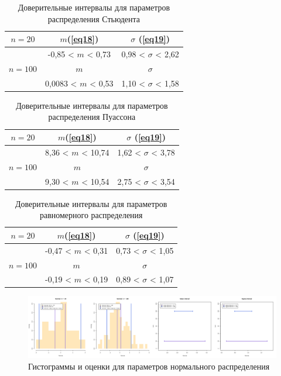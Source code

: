 \begin{table}[H]
\centering
\begin{tabular}{ |c|c|c| } 
 \hline
 $n = 20$ & $m$(\ref{eq18}) & $\sigma$ (\ref{eq19})\\ 
 \hline
  & -0,85 < $m$ < 0,73 & 0,98 < $\sigma$ < 2,62\\ 
  \hline
  $n = 100$ & $m$ & $\sigma$ \\
  \hline
  & 0,0083 < $m$ < 0,53 & 1,10 < $\sigma$ < 1,58 \\ 
 \hline
\end{tabular}
\caption{Доверительные интервалы для параметров распределения Стьюдента}
    \label{table:8}
\end{table}

\begin{table}[H]
\centering
\begin{tabular}{ |c|c|c| } 
 \hline
 $n = 20$ & $m$(\ref{eq18}) & $\sigma$ (\ref{eq19})\\ 
 \hline
  & 8,36 < $m$ < 10,74 & 1,62 < $\sigma$ < 3,78\\ 
  \hline
  $n = 100$ & $m$ & $\sigma$ \\
  \hline
  & 9,30 < $m$ < 10,54 & 2,75 < $\sigma$ < 3,54 \\ 
 \hline
\end{tabular}
\caption{Доверительные интервалы для параметров распределения Пуассона}
    \label{table:9}
\end{table}

\begin{table}[H]
\centering
\begin{tabular}{ |c|c|c| } 
 \hline
 $n = 20$ & $m$(\ref{eq18}) & $\sigma$ (\ref{eq19})\\ 
 \hline
  & -0,47 < $m$ < 0,31 & 0,73 < $\sigma$ < 1,05\\ 
  \hline
  $n = 100$ & $m$ & $\sigma$ \\
  \hline
  & -0,19 < $m$ < 0,19 & 0,89 < $\sigma$ < 1,07 \\ 
 \hline
\end{tabular}
\caption{Доверительные интервалы для параметров равномерного распределения}
    \label{table:10}
\end{table}

\begin{figure}[H]
    \centering
    \includegraphics[width = 1\linewidth]{images/ranges/normal.png}
    \caption{Гистограммы и оценки для параметров нормального распределения}
    \label{fig11}
\end{figure}

